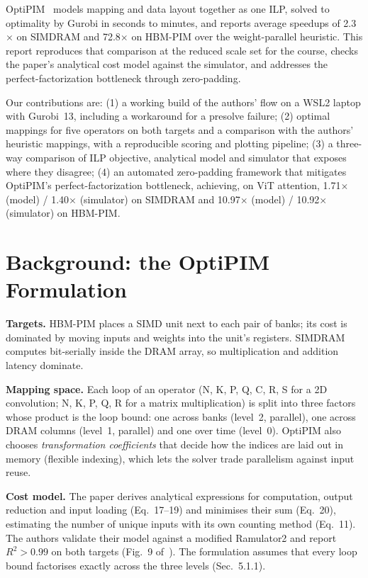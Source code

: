 \documentclass[conference]{IEEEtran}
\begin{document}
OptiPIM~\cite{optipim} models mapping and data layout together as one ILP,
solved to optimality by Gurobi in seconds to minutes, and reports average
speedups of 2.3$\times$ on SIMDRAM and 72.8$\times$ on HBM-PIM over the
weight-parallel heuristic. This report reproduces that comparison at the
reduced scale set for the course, checks the paper's analytical cost model
against the simulator, and addresses the perfect-factorization bottleneck through zero-padding.

Our contributions are: (1) a working build of the authors' flow on a
WSL2 laptop with Gurobi~13, including a workaround for a presolve failure;
(2) optimal mappings for five operators on both targets and a comparison with
the authors' heuristic mappings, with a reproducible scoring and plotting
pipeline; (3) a three-way comparison of ILP objective, analytical model and
simulator that exposes where they disagree; (4) an automated zero-padding framework that mitigates OptiPIM's perfect-factorization bottleneck, achieving, on ViT attention, 1.71$\times$ (model) / 1.40$\times$ (simulator) on SIMDRAM and 10.97$\times$ (model) / 10.92$\times$ (simulator) on HBM-PIM.

\section{Background: the OptiPIM Formulation}
\textbf{Targets.} HBM-PIM places a SIMD unit next to each pair of banks; its
cost is dominated by moving inputs and weights into the unit's registers.
SIMDRAM computes bit-serially inside the DRAM array, so multiplication and
addition latency dominate.

\textbf{Mapping space.} Each loop of an operator (N, K, P, Q, C, R, S for a 2D
convolution; N, K, P, Q, R for a matrix multiplication) is split into three
factors whose product is the loop bound: one across banks (level~2, parallel),
one across DRAM columns (level~1, parallel) and one over time (level~0).
OptiPIM also chooses \emph{transformation coefficients} that decide how the
indices are laid out in memory (flexible indexing), which lets the solver trade
parallelism against input reuse.

\textbf{Cost model.} The paper derives analytical expressions for computation,
output reduction and input loading (Eq.~17--19) and minimises their sum
(Eq.~20), estimating the number of unique inputs with its own counting method
(Eq.~11). The authors validate their model against a modified Ramulator2 and
report $R^2>0.99$ on both targets (Fig.~9 of~\cite{optipim}). The formulation
assumes that every loop bound factorises exactly across the three levels
(Sec.~5.1.1).
\end{document}
